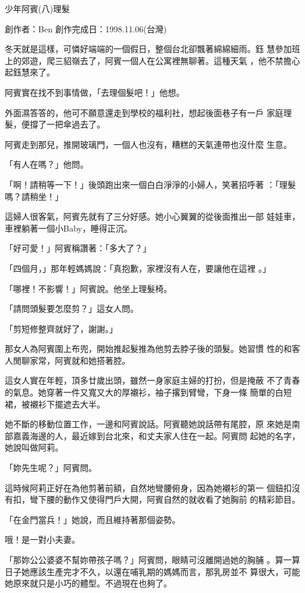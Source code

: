



少年阿賓(八)理髮

創作者：Ben
創作完成日：1998.11.06(台灣)


冬天就是這樣，可憐好端端的一個假日，整個台北卻飄著綿綿細雨。鈺
慧參加班上的郊遊，爬三貂嶺去了，阿賓一個人在公寓裡無聊著。這種天氣
，他不禁擔心起鈺慧來了。

阿賓實在找不到事情做，「去理個髮吧！」他想。

外面濕答答的，他可不願意還走到學校的福利社，想起後面巷子有一戶
家庭理髮，便撐了一把傘過去了。

阿賓走到那兒，推開玻璃門，一個人也沒有，糟糕的天氣連帶也沒什麼
生意。

「有人在嗎？」他問。

「啊！請稍等一下！」後頭跑出來一個白白淨淨的小婦人，笑著招呼著
：「理髮嗎？請稍坐！」

這婦人很客氣，阿賓先就有了三分好感。她小心翼翼的從後面推出一部
娃娃車，車裡躺著一個小Baby，睡得正沉。

「好可愛！」阿賓稱讚著：「多大了？」

「四個月，」那年輕媽媽說：「真抱歉，家裡沒有人在，要讓他在這裡
。」

「哪裡！不影響！」阿賓說。他坐上理髮椅。

「請問頭髮要怎麼剪？」這女人問。

「剪短修整齊就好了，謝謝。」

那女人為阿賓圍上布兜，開始推起髮推為他剪去脖子後的頭髮。她習慣
性的和客人閒聊家常，阿賓就和她搭著腔。

這女人實在年輕，頂多廿歲出頭，雖然一身家庭主婦的打扮，但是掩蔽
不了青春的氣息。她穿著一件又寬又大的厚襯衫，袖子撂到臂彎，下身一條
簡單的白短裙，被襯衫下擺遮去大半。

她不斷的移動位置工作，一邊和阿賓說話。阿賓聽她說話帶有尾腔，原
來她是南部嘉義海邊的人，最近嫁到台北來，和丈夫家人住在一起。阿賓問
起她的名字，她說叫做阿莉。

「妳先生呢？」阿賓問。

這時候阿莉正好在為他剪著前額，自然地彎腰俯身，因為她襯衫的第一
個鈕扣沒有扣，彎下腰的動作又使得門戶大開，阿賓自然的就收看了她胸前
的精彩節目。

「在金門當兵！」她說，而且維持著那個姿勢。

哦！是一對小夫妻。

「那妳公公婆婆不幫妳帶孩子嗎？」阿賓問，眼睛可沒離開過她的胸脯
。算一算日子她應該生產完才不久，以還在哺乳期的媽媽而言，那乳房並不
算很大，可能她原來就只是小巧的體型。不過現在也夠了。

